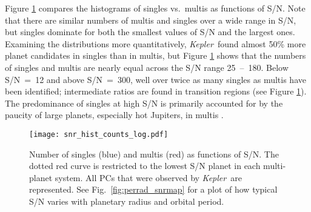 \documentclass{aastex62}
\newcommand{\ik}{{\it Kepler~}}
\begin{document}
Figure \ref{fig:snr_comparison} compares the histograms of singles vs.~multis as functions of S/N. Note that there are similar numbers of multis and singles over a wide range in S/N, but singles dominate for both the smallest values of S/N and the largest ones. Examining the distributions more quantitatively, \ik found almost 50\% more planet candidates in singles than in multis, but Figure \ref{fig:snr_comparison} shows that the numbers of singles and multis are nearly equal across the S/N range 25~--~180.  Below S/N~=~12 and above S/N~=~300, well over twice as many singles as multis have been identified; intermediate ratios are found in transition regions (see Figure \ref{fig:snr_comparison}).  The predominance of singles at high S/N is primarily accounted for by the paucity of large planets, especially hot Jupiters, in multis \citep{Latham:2011, Steffen:2012}. 

\begin{figure}
    \centering
    \texttt{[image: snr\_hist\_counts\_log.pdf]}
    \caption{Number of singles (blue) and multis (red) as functions of S/N. The dotted red curve is restricted to the lowest S/N planet in each multi-planet system. All PCs that were observed by \ik are represented. See Fig.~\ref{fig:perrad_snrmap} for a plot of how typical S/N varies with planetary radius and orbital period.  }%
    \label{fig:snr_comparison}
\end{figure}
\end{document}
